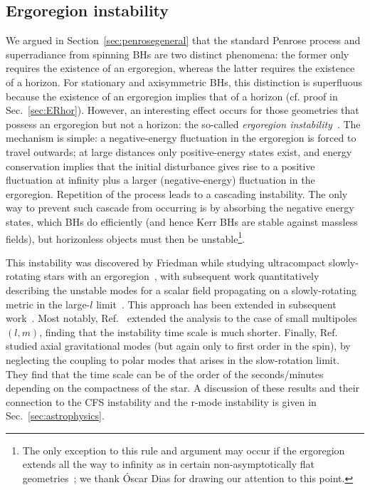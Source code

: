 \documentclass[11pt]{article}
\numberwithin{equation}{section} %
\begin{document}
\subsection{Ergoregion instability}\label{sec:ergoregioninstability}
We argued in Section~\ref{sec:penrosegeneral} that the standard Penrose process and superradiance from spinning BHs are two distinct phenomena: the former only requires the existence of an ergoregion, whereas the latter requires the existence of a horizon. For stationary and axisymmetric BHs, this distinction is superfluous because the existence of an ergoregion implies that of a horizon (cf. proof in Sec.~\ref{sec:ERhor}). However, an interesting effect occurs for those geometries that possess an ergoregion but not a horizon: the so-called \emph{ergoregion instability}~\cite{1978CMaPh..63..243F,Sato:1978ue}. The mechanism is simple: a negative-energy fluctuation in the ergoregion is forced to travel outwards; at large distances only positive-energy states exist, and energy conservation implies that the initial disturbance gives rise to a positive fluctuation at infinity plus a larger (negative-energy)
fluctuation in the ergoregion. Repetition of the process leads to a cascading instability. The only way to prevent such cascade from occurring is by absorbing the negative energy states, which BHs do efficiently (and hence Kerr BHs are stable against massless fields), but horizonless objects must then be unstable\footnote{The only exception to this rule and argument may occur if the ergoregion extends all the way to infinity as in certain non-asymptotically flat geometries~\cite{Dias:2009ex,Dias:2012pp}; we thank \'Oscar Dias for drawing our attention to this point.}.


This instability was discovered by Friedman while studying ultracompact slowly-rotating stars with an ergoregion~\cite{1978CMaPh..63..243F,Vilenkin:1978uc,Sato:1978ue}, with subsequent work quantitatively describing 
the unstable modes for a scalar field propagating on a slowly-rotating metric in the large-$l$ limit~\cite{CominsSchutz}. 
This approach has been extended in subsequent work~\cite{1996MNRAS.282..580Y,Cardoso:2007az,Chirenti:2008pf}.
Most notably, Ref.~\cite{1996MNRAS.282..580Y} extended the analysis to the case of small multipoles $(l,m)$, finding that the instability time scale is much shorter. Finally, Ref.~\cite{Kokkotas:2002sf} studied axial gravitational modes (but again only to first order in the spin), by neglecting the coupling to polar modes that arises in the slow-rotation limit. They find that the time scale can be of the order of the seconds/minutes
depending on the compactness of the star. A discussion of these results and their connection to the CFS instability and the r-mode instability is given in Sec.~\ref{sec:astrophysics}.
\end{document}
